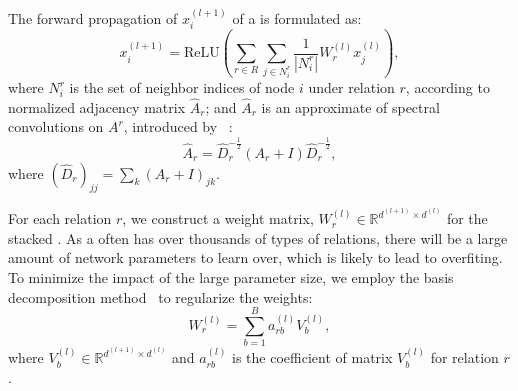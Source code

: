    The forward propagation of $x_i^{(l+1)}$ of a \RGCN is formulated as:
	\begin{equation}
	x_i^{(l+1)}=\mathrm{ReLU} (\sum\limits_{r \in R}\sum\limits_{j \in N_i^r}\frac{1}{|N_i^r|}W_r^{(l)}x_j^{(l)}),
	\end{equation}
where $N_i^r$ is the set of neighbor indices of node $i$ under relation $r$, according to normalized adjacency matrix $\hat A_r$; and $\hat
A_r$ is an approximate of spectral convolutions on $A^r$, introduced by ~\cite{Kipf2016Semi}:
	\begin{equation}
	\hat A_r=\hat D_r^{- \frac{1}{2}}(A_r+I)\hat D_r^{- \frac{1}{2}},
	\end{equation}
	where $(\hat D_r)_{jj}=\sum_k(A_r+I)_{jk}$.

	
	 For each relation $r$, we construct a weight matrix, $W_r^{(l)} \in \mathbb{R}^{d^{(l+1)}
\times d^{(l)}}$ for the stacked \RGCNs. As a \KG often has over thousands of types of relations, there will be a large amount of network
parameters to learn over, which is likely to lead to overfiting. To minimize the impact of the large parameter size, we employ the basis
decomposition method~\cite{Schlichtkrull2017Modeling} to regularize the weights:
	\begin{equation}
	W_r^{(l)}=\sum\limits_{b=1}^B a_{rb}^{(l)}V_b^{(l)},
	\end{equation}
	where $V_b^{(l)} \in \mathbb{R}^{d^{(l+1)} \times d^{(l)}}$ and $a_{rb}^{(l)}$ is the coefficient of matrix $V_b^{(l)}$ for relation $r$.
	
	


